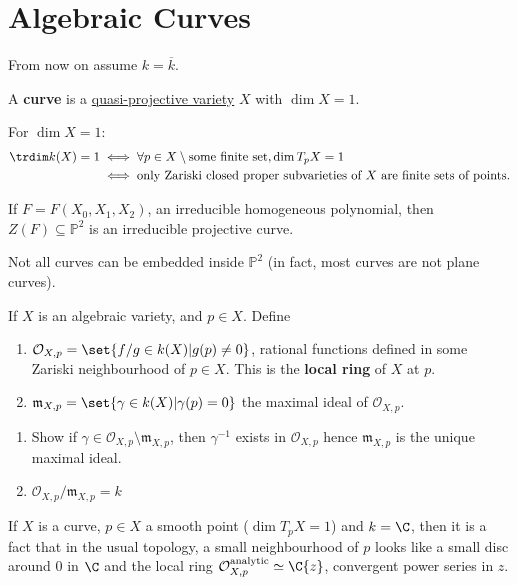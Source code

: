 \documentclass{article}
\newcommand{\proj}{\mathbb{P}}
\begin{document}
\section{Algebraic Curves}
From now on assume $k = \overline{k}$.
\begin{defi}
    A \textbf{curve} is a \hyperlink{def:quasiProjVar}{quasi-projective variety} $X$ with $\dim X = 1$.
\end{defi}
For $\dim X = 1$:
\begin{align*}
    \trdim k(X) = 1 &\iff \forall p \in X \setminus \text{some finite set}, \dim T_p X = 1 \\
                    &\iff \text{only Zariski closed proper subvarieties of $X$ are finite sets of points}.
\end{align*}
\begin{eg}
    If $F = F(X_0, X_1, X_2)$, an irreducible homogeneous polynomial, then $Z(F) \subseteq \proj^2$ is an irreducible projective curve.
\end{eg}
\begin{warning}
    Not all curves can be embedded inside $\proj^2$ (in fact, most curves are not plane curves).
\end{warning}
\begin{defi}
    If $X$ is an algebraic variety, and $p \in X$. Define
    \begin{enumerate}[label=(\roman*)]
        \item $\mathcal{O}_{X, p} = \set{f / g \in k(X) | g(p) \neq 0}$, rational functions defined in some Zariski neighbourhood of $p \in X$. This is the \textbf{local ring} of $X$ at $p$.
        \item $\mathfrak{m}_{X, p} = \set{\gamma \in k(X) | \gamma(p) = 0}$ the maximal ideal of $\mathcal{O}_{X, p}$.
    \end{enumerate}
\end{defi}
\begin{ex}\leavevmode
    \begin{enumerate}[label=(\roman*)]
        \item Show if $\gamma \in \mathcal{O}_{X, p} \setminus \mathfrak{m}_{X, p}$, then $\gamma^{-1}$ exists in $\mathcal{O}_{X, p}$ hence $\mathfrak{m}_{X, p}$ is the unique maximal ideal.
        \item $\mathcal{O}_{X, p} / \mathfrak{m}_{X, p} = k$
    \end{enumerate}
\end{ex}
If $X$ is a curve, $p \in X$ a smooth point ($\dim T_p X = 1$) and $k = \C$, then it is a fact that in the usual topology, a small neighbourhood of $p$ looks like a small disc around $0$ in $\C$ and the local ring $\mathcal{O}_{X, p}^\text{analytic} \simeq \C \{z\}$, convergent power series in $z$.
\end{document}
